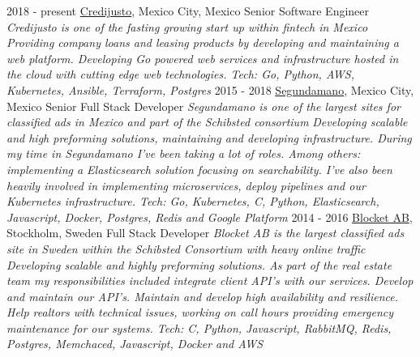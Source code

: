 \documentclass[]{friggeri-cv}
\begin{document}
\begin{entrylist}
  \bigentry
    {2018 - present}
    {{\href{https://www.credijusto.com/}{Credijusto}}, Mexico City, Mexico} {Senior Software Engineer}
    {\emph{Credijusto is one of the fasting growing start up within fintech in Mexico}}
    {\textit{Providing company loans and leasing products by developing and maintaining a web platform. Developing Go powered web services and infrastructure hosted in the cloud with cutting edge web technologies. Tech: Go, Python, AWS, Kubernetes, Ansible, Terraform, Postgres}\newline }
  \bigentry
    {2015 - 2018}
    {{\href{https://www.segundamano.com.mx/}{Segundamano}}, Mexico City, Mexico} {Senior Full Stack Developer}
    {\emph{Segundamano is one of the largest sites for classified ads in Mexico and part of the Schibsted consortium}}
    {\textit{Developing scalable and high preforming solutions, maintaining and developing infrastructure. During my time in Segundamano I've been taking a lot of roles. Among others: implementing a Elasticsearch solution focusing on searchability. I've also been heavily involved in implementing microservices, deploy pipelines and our Kubernetes infrastructure. Tech: Go, Kubernetes, C, Python, Elasticsearch, Javascript, Docker, Postgres, Redis and Google Platform}\newline}
  \bigentry
    {2014 - 2016}
    {{\href{http://blocket.se}{Blocket AB}}, Stockholm, Sweden} {Full Stack Developer}
    {\emph{Blocket AB is the largest classified ads site in Sweden within the Schibsted Consortium with heavy online traffic}}
    {\textit{Developing scalable and highly preforming solutions. As part of the real estate team my responsibilities included integrate client API's with our services. Develop and maintain our API's. Maintain and develop high availability and resilience. Help realtors with technical issues, working on call hours providing emergency maintenance for our systems. Tech: C, Python, Javascript, RabbitMQ, Redis, Postgres, Memchaced, Javascript, Docker and AWS}\newline}
\end{entrylist}
\end{document}

